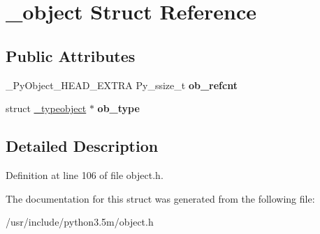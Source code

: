 \hypertarget{struct__object}{}\section{\+\_\+object Struct Reference}
\label{struct__object}
\subsection*{Public Attributes}
\begin{DoxyCompactItemize}
\item 
\+\_\+\+Py\+Object\+\_\+\+H\+E\+A\+D\+\_\+\+E\+X\+T\+RA Py\+\_\+ssize\+\_\+t {\bfseries ob\+\_\+refcnt}\hypertarget{struct__object_afee3fb771b622e3936aadf6b11b137f7}{}\label{struct__object_afee3fb771b622e3936aadf6b11b137f7}

\item 
struct \hyperlink{struct__typeobject}{\+\_\+typeobject} $\ast$ {\bfseries ob\+\_\+type}\hypertarget{struct__object_a2cf8fe2803bdc65ba61d26ad90f6bc57}{}\label{struct__object_a2cf8fe2803bdc65ba61d26ad90f6bc57}

\end{DoxyCompactItemize}


\subsection{Detailed Description}


Definition at line 106 of file object.\+h.



The documentation for this struct was generated from the following file\+:\begin{DoxyCompactItemize}
\item 
/usr/include/python3.\+5m/object.\+h\end{DoxyCompactItemize}
